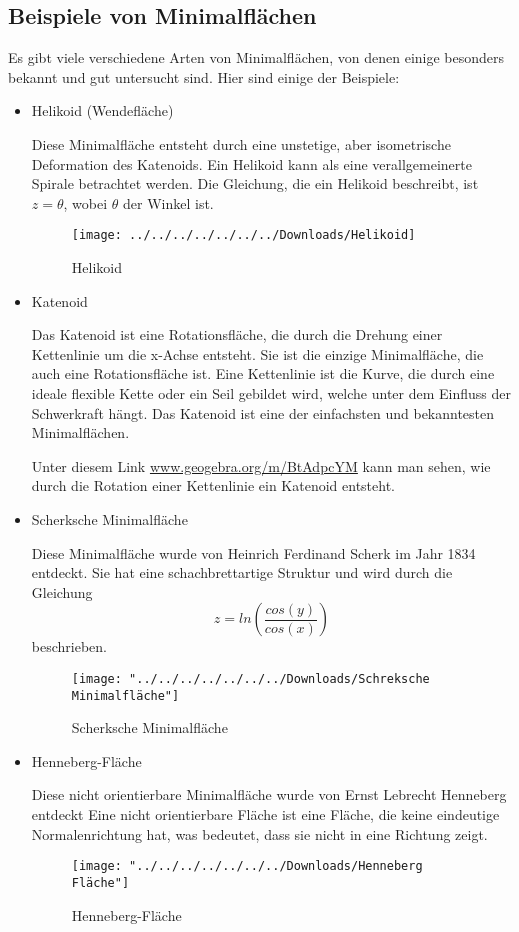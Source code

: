 \subsection{Beispiele von Minimalflächen
	\label{minimalflaechen:subsection:Beispiele von Minimalflächen}}
Es gibt viele verschiedene Arten von Minimalflächen, von denen einige besonders bekannt und gut untersucht sind.
Hier sind einige der Beispiele:
\begin{itemize}
	\item
	Helikoid (Wendefläche)
	
	Diese Minimalfläche entsteht durch eine unstetige, aber isometrische Deformation des Katenoids.
	Ein Helikoid kann als eine verallgemeinerte Spirale betrachtet werden.
	Die Gleichung, die ein Helikoid beschreibt, ist $z=\theta$, wobei $\theta$ der Winkel ist.
	\begin{figure}
		\centering
		\texttt{[image: ../../../../../../../Downloads/Helikoid]}
		\caption{Helikoid}
		\label{fig:helikoid}
	\end{figure}
	\item
	Katenoid
	
	Das Katenoid ist eine Rotationsfläche, die durch die Drehung einer Kettenlinie um die x-Achse entsteht.
	Sie ist die einzige Minimalfläche, die auch eine Rotationsfläche ist.
	Eine Kettenlinie ist die Kurve, die durch eine ideale flexible Kette oder ein Seil gebildet wird, welche unter dem Einfluss der Schwerkraft hängt.
	Das Katenoid ist eine der einfachsten und bekanntesten Minimalflächen.
	
	Unter diesem Link \href{https://www.geogebra.org/m/BtAdpcYM}{www.geogebra.org/m/BtAdpcYM} kann man sehen, wie durch die Rotation einer Kettenlinie ein Katenoid entsteht.
	\item
	Scherksche Minimalfläche
	
	Diese Minimalfläche wurde von Heinrich Ferdinand Scherk im Jahr 1834 entdeckt.
	Sie hat eine schachbrettartige Struktur und wird durch die Gleichung 
	\begin{equation}
		z=ln(\frac{cos(y)}{cos(x)}) 
	\end{equation}
	beschrieben.
	
	\begin{figure}
		\centering
		\texttt{[image: "../../../../../../../Downloads/Schreksche Minimalfläche"]}
		\caption{Scherksche Minimalfläche}
		\label{fig:schreksche-minimalflache}
	\end{figure}
	\item
	Henneberg-Fläche
	
	Diese nicht orientierbare Minimalfläche wurde von Ernst Lebrecht Henneberg entdeckt
	Eine nicht orientierbare Fläche ist eine Fläche, die keine eindeutige Normalenrichtung hat, was bedeutet, dass sie nicht in eine Richtung zeigt.
	
	\begin{figure}
		\centering
		\texttt{[image: "../../../../../../../Downloads/Henneberg Fläche"]}
		\caption{Henneberg-Fläche}
		\label{fig:henneberg-flache}
	\end{figure}
\end{itemize}

